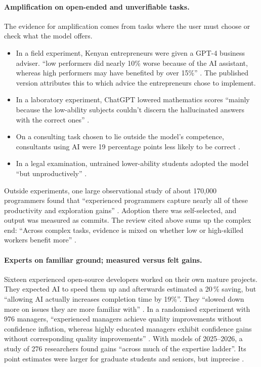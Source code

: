 \paragraph{Amplification on open-ended and unverifiable tasks.}
The evidence for amplification comes from tasks where the user must
choose or check what the model offers.
\begin{itemize}
\item In a field experiment, Kenyan entrepreneurs were given a GPT-4
  business adviser. \enquote{low performers did nearly 10\% worse because
  of the AI assistant, whereas high performers may have benefited by over
  15\%} \autocite{Otis2026Uneven}. The published version attributes this
  to which advice the entrepreneurs chose to implement.
\item In a laboratory experiment, ChatGPT lowered mathematics scores
  \enquote{mainly because the low-ability subjects couldn't discern the
  hallucinated answers with the correct ones} \autocite{Kim2024Helping}.
\item On a consulting task chosen to lie outside the model's competence,
  consultants using AI were 19 percentage points less likely to be
  correct \autocite{DellAcqua2026Navigating}.
\item In a legal examination, untrained lower-ability students adopted
  the model \enquote{but unproductively} \autocite{Chen2026Training}.
\end{itemize}
Outside experiments, one large observational study of about 170,000
programmers found that \enquote{experienced programmers capture nearly
all of these productivity and exploration gains}
\autocite{Daniotti2026Who}. Adoption there was self-selected, and output
was measured as commits. The review cited above sums up the complex end:
\enquote{Across complex tasks, evidence is mixed on whether low or
high-skilled workers benefit more} \autocite{DelRioChanona2025AI}.

\paragraph{Experts on familiar ground; measured versus felt gains.}
Sixteen experienced open-source developers worked on their own mature
projects. They expected AI to speed them up and afterwards estimated a
20\,\% saving, but \enquote{allowing AI actually increases completion
time by 19\%}. They \enquote{slowed down more on issues they are more
familiar with} \autocite{Becker2025Measuring}. In a randomised experiment
with 976 managers, \enquote{experienced managers achieve quality
improvements without confidence inflation, whereas highly educated
managers exhibit confidence gains without corresponding quality
improvements} \autocite{Camuffo2026Beyond}. With models of 2025--2026, a
study of 276 researchers found gains \enquote{across much of the
expertise ladder}. Its point estimates were larger for graduate students
and seniors, but imprecise \autocite{Aparicio2026Generative}.

